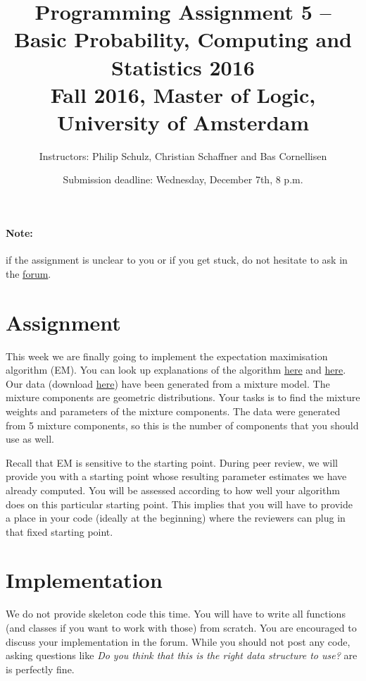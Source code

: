 \documentclass[11pt, leqno, a4paper]{article}
\title{Programming Assignment 5 -- Basic Probability, Computing and Statistics 2016 \\[2mm]
\large{Fall 2016, Master of Logic, University of Amsterdam}}
\author{Instructors: Philip Schulz, Christian Schaffner and Bas Cornellisen}
\date{Submission deadline: Wednesday, December 7th, 8 p.m.}
\begin{document}
\maketitle

\paragraph{Note:} if the assignment is unclear to you or if you get
stuck, do not hesitate to ask in the
\href{https://www.moodle.ch/lms/mod/forum/view.php?id=1721}{forum}.

\section{Assignment}

This week we are finally going to implement the expectation maximisation algorithm (EM). You can look up explanations of the algorithm 
\href{https://github.com/BasicProbability/LectureNotes/blob/master/chapter6/chapter6.pdf}{here} and 
\href{}{here}. Our data (download \href{https://github.com/BasicProbability/BasicProbability.github.io/raw/master/Homework/Programming/2016-17/Assignment5/geometric_data.txt}{here}) have been generated from a mixture model. The mixture components are geometric distributions. Your tasks is to find
the mixture weights and parameters of the mixture components. The data were generated from 5 mixture components, so this is the number of components
that you should use as well.

Recall that EM is sensitive to the starting point. During peer review, we will
provide you with a starting point whose resulting parameter estimates we have already computed. You will be assessed according to how well your
algorithm does on this particular starting point. This implies that you will have to provide a place in your code (ideally at the beginning) where
the reviewers can plug in that fixed starting point.

\section{Implementation}

We do not provide skeleton code this time. You will have to write all functions (and classes if you want to work with those) from scratch. You are encouraged
to discuss your implementation in the forum. While you should not post any code, asking questions like \textit{Do you think that this is the right data structure
to use?} are is perfectly fine. 
\end{document}
